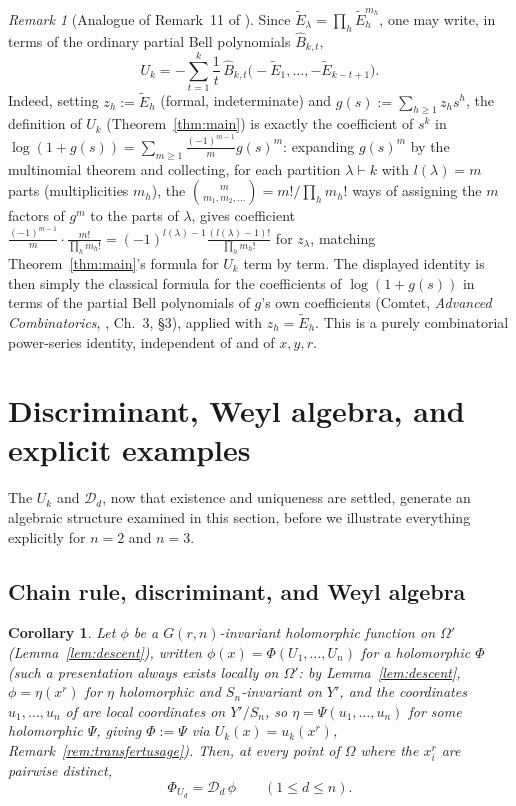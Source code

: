 \documentclass[11pt]{article}
\newtheorem{corollary}[theorem]{Corollary}
\theoremstyle{remark}
\newtheorem{remark}[theorem]{Remark}
\begin{document}
\begin{remark}[Analogue of Remark~11 of \cite{Ze}]
Since $\widetilde E_\lambda=\prod_h \widetilde E_h^{m_h}$, one may write, in terms of the ordinary partial Bell polynomials $\hat B_{k,t}$,
\[
U_k = -\sum_{t=1}^{k} \frac{1}{t}\,\hat B_{k,t}\big(-\widetilde E_1,\dots,-\widetilde E_{k-t+1}\big).
\]
Indeed, setting $z_h:=\widetilde E_h$ (formal, indeterminate) and $g(s):=\sum_{h\ge1}z_hs^h$, the definition of $U_k$ (Theorem~\ref{thm:main}) is exactly the coefficient of $s^k$ in $\log(1+g(s))=\sum_{m\ge1}\frac{(-1)^{m-1}}{m}g(s)^m$: expanding $g(s)^m$ by the multinomial theorem and collecting, for each partition $\lambda\vdash k$ with $l(\lambda)=m$ parts (multiplicities $m_h$), the $\binom{m}{m_1,m_2,\dots}=m!/\prod_hm_h!$ ways of assigning the $m$ factors of $g^m$ to the parts of $\lambda$, gives coefficient $\frac{(-1)^{m-1}}{m}\cdot\frac{m!}{\prod_hm_h!}=(-1)^{l(\lambda)-1}\frac{(l(\lambda)-1)!}{\prod_hm_h!}$ for $z_\lambda$, matching Theorem~\ref{thm:main}'s formula for $U_k$ term by term. The displayed identity is then simply the classical formula for the coefficients of $\log(1+g(s))$ in terms of the partial Bell polynomials of $g$'s own coefficients (Comtet, \emph{Advanced Combinatorics}, \cite{Comtet}, Ch.~3, \S3), applied with $z_h=\widetilde E_h$. This is a purely combinatorial power-series identity, independent of \cite{Ze} and of $x,y,r$.
\end{remark}

\section{Discriminant, Weyl algebra, and explicit examples}

The $U_k$ and $\mathcal D_d$, now that existence and uniqueness are settled, generate an algebraic structure examined in this section, before we illustrate everything explicitly for $n=2$ and $n=3$.

\subsection{Chain rule, discriminant, and Weyl algebra}

\begin{corollary}\label{cor:cor12}
Let $\phi$ be a $G(r,n)$-invariant holomorphic function on $\Omega'$ (Lemma~\ref{lem:descent}), written $\phi(x)=\Phi(U_1,\dots,U_n)$ for a holomorphic $\Phi$ (such a presentation always exists locally on $\Omega'$: by Lemma~\ref{lem:descent}, $\phi=\eta(x^r)$ for $\eta$ holomorphic and $S_n$-invariant on $Y'$, and the coordinates $u_1,\dots,u_n$ of \cite{Ze} are local coordinates on $Y'/S_n$, so $\eta=\Psi(u_1,\dots,u_n)$ for some holomorphic $\Psi$, giving $\Phi:=\Psi$ via $U_k(x)=u_k(x^r)$, Remark~\ref{rem:transfertusage}). Then, at every point of $\Omega$ where the $x_i^r$ are pairwise distinct,
\[
\Phi_{U_d} = \mathcal D_d\,\phi \qquad (1\le d\le n).
\]
\end{corollary}
\end{document}
